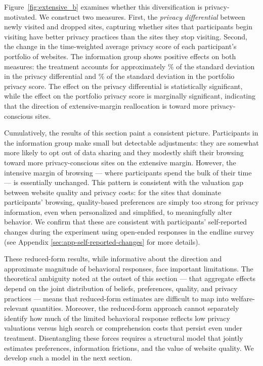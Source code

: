 \documentclass[12pt]{article}
\theoremstyle{definition}
\theoremstyle{remark}
\begin{document}
Figure~\ref{fig:extensive_b} examines whether this diversification is privacy-motivated. We construct two measures. First, the \emph{privacy differential} between newly visited and dropped sites, capturing whether sites that participants begin visiting have better privacy practices than the sites they stop visiting. Second, the change in the time-weighted average privacy score of each participant's portfolio of websites. The information group shows positive effects on both measures: the treatment accounts for approximately \privacyDifferentialPctSD{}\% of the standard deviation in the privacy differential and \portfolioPrivacyPctSD{}\% of the standard deviation in the portfolio privacy score. The effect on the privacy differential is statistically significant, while the effect on the portfolio privacy score is marginally significant, indicating that the direction of extensive-margin reallocation is toward more privacy-conscious sites.

\noindent Cumulatively, the results of this section paint a consistent picture. Participants in the information group make small but detectable adjustments: they are somewhat more likely to opt out of data sharing and they modestly shift their browsing toward more privacy-conscious sites on the extensive margin. However, the intensive margin of browsing --- where participants spend the bulk of their time --- is essentially unchanged. This pattern is consistent with the valuation gap between website quality and privacy costs: for the sites that dominate participants' browsing, quality-based preferences are simply too strong for privacy information, even when personalized and simplified, to meaningfully alter behavior. We confirm that these are consistent with participants' self-reported changes during the experiment using open-ended responses in the endline survey (see Appendix \ref{sec:app-self-reported-changes} for more details).
 
These reduced-form results, while informative about the direction and approximate magnitude of behavioral responses, face important limitations. The theoretical ambiguity noted at the outset of this section --- that aggregate effects depend on the joint distribution of beliefs, preferences, quality, and privacy practices --- means that reduced-form estimates are difficult to map into welfare-relevant quantities. Moreover, the reduced-form approach cannot separately identify how much of the limited behavioral response reflects low privacy valuations versus high search or comprehension costs that persist even under treatment. Disentangling these forces requires a structural model that jointly estimates preferences, information frictions, and the value of website quality. We develop such a model in the next section.
\end{document}
